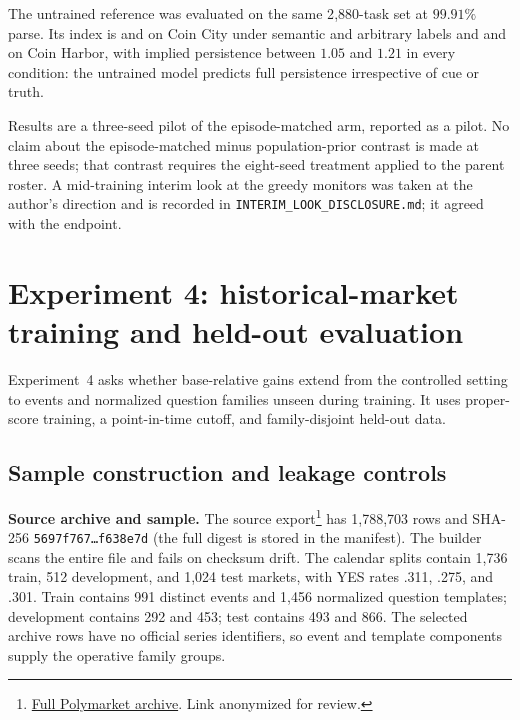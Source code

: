 The untrained reference was evaluated on the same 2{,}880-task set at $99.91\%$
parse. Its index is \eSelCitySemBase{} and \eSelCityArbBase{} on Coin City under
semantic and arbitrary labels and \eSelHarborSemBase{} and \eSelHarborArbBase{}
on Coin Harbor, with implied persistence between $1.05$ and $1.21$ in every
condition: the untrained model predicts full persistence irrespective of cue or
truth.

Results are a three-seed pilot of the episode-matched arm, reported as a pilot.
No claim about the episode-matched minus population-prior contrast is made at
three seeds; that contrast requires the eight-seed treatment applied to the
parent roster. A mid-training interim look at the greedy monitors was taken at
the author's direction and is recorded in
\texttt{INTERIM\_LOOK\_DISCLOSURE.md}; it agreed with the endpoint.





\section{Experiment 4: historical-market training and held-out evaluation}
\label{app:exp4}
\label{app:exp3b-protocol}

Experiment~4 asks whether base-relative gains extend from the controlled setting
to events and normalized question families unseen during training. It uses
proper-score training, a point-in-time cutoff, and family-disjoint held-out data.

\subsection{Sample construction and leakage controls}

\noindent\textbf{Source archive and sample.}
The source export\footnote{%
  \;%
  \href{https://huggingface.co/datasets/anonymous-review/polymarket-full-market-data}%
  {Full Polymarket archive}. Link anonymized for review.%
} has 1,788,703 rows and SHA-256
\texttt{5697f767\ldots f638e7d} (the full digest is stored in the manifest).
The builder scans the entire file and fails on checksum drift. The calendar
splits contain 1,736 train, 512 development, and 1,024 test markets, with YES rates
.311, .275, and .301. Train contains 991 distinct events and 1,456 normalized
question templates; development contains 292 and 453; test contains 493 and 866.
The selected archive rows have no official series identifiers, so event and
template components supply the operative family groups.

